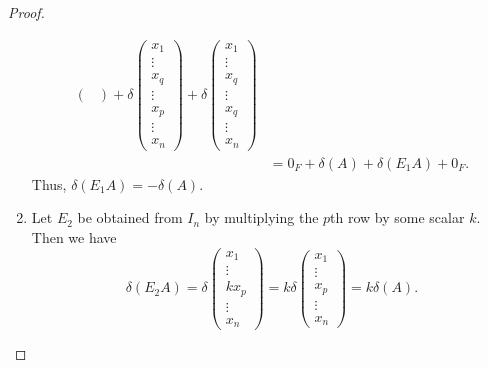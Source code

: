 \begin{proof}
\begin{enumerate}
\begin{align*}
\begin{pmatrix}
      \end{pmatrix}
      +
      \delta
      \begin{pmatrix}
        x_1 \\ \vdots \\ x_q \\ \vdots \\ x_p \\ \vdots \\ x_n
      \end{pmatrix}
      +
      \delta
      \begin{pmatrix}
        x_1 \\ \vdots \\ x_q \\ \vdots \\ x_q \\ \vdots \\ x_n
      \end{pmatrix} \\
      &= 0_F + \delta(A) + \delta(E_1A) + 0_F.
    \end{align*}
    Thus, $\delta(E_1A) = -\delta(A)$.

    \item Let $E_2$ be obtained from $I_n$ by multiplying the $p$th row
    by some scalar $k$.
    Then we have
    \begin{equation*}
      \delta(E_2A)
      = \delta
      \begin{pmatrix}
        x_1 \\ \vdots \\ kx_p \\ \vdots \\ x_n
      \end{pmatrix}
      = k\delta
      \begin{pmatrix}
        x_1 \\ \vdots \\ x_p \\ \vdots \\ x_n
      \end{pmatrix}
      = k\delta(A).
    \end{equation*}


\end{enumerate}
\end{proof}
